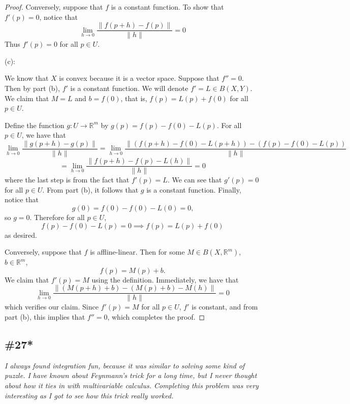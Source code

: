 \documentclass{article}
\theoremstyle{plain} %
\numberwithin{thm}{section} %
\theoremstyle{definition}
\begin{document}
\begin{proof}
            Conversely, suppose that \(f\) is a constant function. To show that \(f'(p) = 0\), notice that
            \[
                \lim_{h \to 0} \frac{\|f(p + h) - f(p)\|}{\|h\|} = 0
            \]
            Thus \(f'(p) = 0\) for all \(p \in U\).

            (c):

            We know that \(X\) is convex because it is a vector space. Suppose that \(f'' = 0\). Then by part (b), \(f'\) is a constant function. We will denote \(f' = L \in B(X,Y)\). We claim that \(M = L\) and \(b = f(0)\), that is, \(f(p) = L(p) + f(0)\) for all \(p \in U\).

            Define the function \(g: U \to \mathbb{R}^m\) by \(g(p) = f(p) - f(0) - L(p)\). For all \(p \in U\), we have that
            \[
                \lim_{h \to 0} \frac{\|g(p + h) - g(p)\|}{\|h\|} = \lim_{h \to 0} \frac{\|(f(p+h) - f(0) - L(p+h)) - (f(p) - f(0) - L(p))}{\|h\|}
            \]
            \[
                = \lim_{h \to 0} \frac{\|f(p+h) - f(p) - L(h)\|}{\|h\|} = 0
            \]
            where the last step is from the fact that \(f'(p) = L\). We can see that \(g'(p) = 0\) for all \(p \in U\). From part (b), it follows that \(g\) is a constant function. Finally, notice that
            \[
                g(0) = f(0) - f(0) - L(0) = 0 \text{,} 
            \]
            so \(g = 0\). Therefore for all \(p \in U\),
            \[
                f(p) - f(0) - L(p) = 0 \implies f(p) = L(p) + f(0)
            \]
            as desired.

            Conversely, suppose that \(f\) is affline-linear. Then for some \(M \in B(X, \mathbb{R}^m)\), \(b \in \mathbb{R}^m\),
            \[
                f(p) = M(p) + b \text{.} 
            \]
            We claim that \(f'(p) = M\) using the definition. Immediately, we have that
            \[
                \lim_{h \to 0} \frac{\|(M(p+h) + b) - (M(p) + b) - M(h)\|}{\|h\|} = 0
            \]
            which verifies our claim. Since \(f'(p) = M\) for all \(p \in U\), \(f'\) is constant, and from part (b), this implies that \(f'' = 0\), which completes the proof.
        \end{proof}

        \subsection{\#27*}

        \textit{I always found integration fun, because it was similar to solving some kind of puzzle. I have known about Feynmann's trick for a long time, but I never thought about how it ties in with multivariable calculus. Completing this problem was very interesting as I got to see how this trick really worked.}
\end{document}
